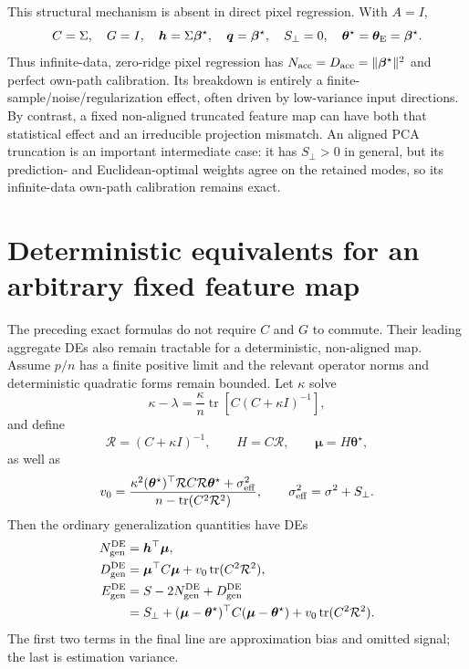 \documentclass[11pt]{article}
\newcommand{\tr}{\operatorname{tr}}
\newcommand{\bstar}{\bm\beta^{\star}}
\newcommand{\tstar}{\bm\theta^{\star}}
\begin{document}
This structural mechanism is absent in direct pixel regression.  With $A=I$,
\begin{equation}
  C=\Sigma,\quad G=I,\quad \bm h=\Sigma\bstar,
  \quad\bm q=\bstar,\quad S_{\perp}=0,
  \quad\tstar=\bm\theta_{\rm E}=\bstar.
\end{equation}
Thus infinite-data, zero-ridge pixel regression has
$N_{\rm acc}=D_{\rm acc}=\lVert\bstar\rVert^2$ and perfect own-path
calibration.  Its breakdown is entirely a finite-sample/noise/regularization
effect, often driven by low-variance input directions.  By contrast, a fixed
non-aligned truncated feature map can have both that statistical effect and
an irreducible projection mismatch.  An aligned PCA truncation is an
important intermediate case: it has $S_{\perp}>0$ in general, but its
prediction- and Euclidean-optimal weights agree on the retained modes, so its
infinite-data own-path calibration remains exact.

\section{Deterministic equivalents for an arbitrary fixed feature map}
\label{sec:fixed-feature-de}

The preceding exact formulas do not require $C$ and $G$ to commute.  Their
leading aggregate DEs also remain tractable for a deterministic, non-aligned
map.  Assume $p/n$ has a finite positive limit and the relevant operator norms
and deterministic quadratic forms remain bounded.  Let $\kappa$ solve
\begin{equation}
  \kappa-\lambda
  =\frac{\kappa}{n}\tr[C(C+\kappa I)^{-1}],
  \label{eq:general-kappa-fixed-point}
\end{equation}
and define
\begin{equation}
  \mathcal R=(C+\kappa I)^{-1},\qquad
  H=C\mathcal R,\qquad
  \bm\mu=H\tstar,
\end{equation}
as well as
\begin{equation}
  v_0=
  \frac{\kappa^2(\tstar)^{\top}\mathcal R C\mathcal R\tstar
        +\sigma_{\rm eff}^2}
       {n-\tr(C^2\mathcal R^2)},
  \qquad \sigma_{\rm eff}^2=\sigma^2+S_{\perp}.
  \label{eq:general-v0}
\end{equation}
Then the ordinary generalization quantities have DEs
\begin{align}
  N_{\rm gen}^{\rm DE}
    &=\bm h^{\top}\bm\mu,\\
  D_{\rm gen}^{\rm DE}
    &=\bm\mu^{\top}C\bm\mu
      +v_0\tr(C^2\mathcal R^2),\\
  E_{\rm gen}^{\rm DE}
    &=S-2N_{\rm gen}^{\rm DE}+D_{\rm gen}^{\rm DE}\nonumber\\
    &=S_{\perp}+(\bm\mu-\tstar)^{\top}C(\bm\mu-\tstar)
      +v_0\tr(C^2\mathcal R^2).
  \label{eq:general-feature-gen-de}
\end{align}
The first two terms in the final line are approximation bias and omitted
signal; the last is estimation variance.
\end{document}
